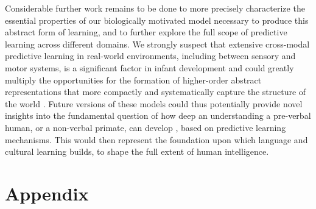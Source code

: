 \documentclass[11pt,twoside]{article}
\newif\myifpdf
\begin{document}




Considerable further work remains to be done to more precisely characterize the essential properties of our biologically motivated model necessary to produce this abstract form of learning, and to further explore the full scope of predictive learning across different domains.  We strongly suspect that extensive cross-modal predictive learning in real-world environments, including between sensory and motor systems, is a significant factor in infant development and could greatly multiply the opportunities for the formation of higher-order abstract representations that more compactly and systematically capture the structure of the world \citep{YuSmith12}.  Future versions of these models could thus potentially provide novel insights into the fundamental question of how deep an understanding a pre-verbal human, or a non-verbal primate, can develop \citep{SpelkeBreinlingerMacomberEtAl92,ElmanBatesKarmiloff-SmithEtAl96}, based on predictive learning mechanisms.  This would then represent the foundation upon which language and cultural learning builds, to shape the full extent of human intelligence.

\clearpage


\section{Appendix}



\clearpage


\end{document}
